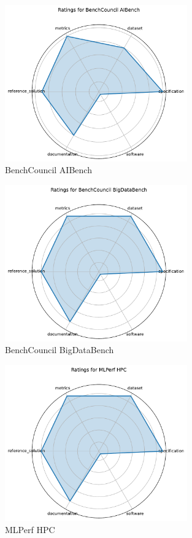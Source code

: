\documentclass{article}
\begin{document}
\begin{figure}[h!]
  \centering
  \includegraphics[width=0.7\textwidth]{BenchCouncil AIBench_radar.pdf}
  \caption{BenchCouncil AIBench}
\end{figure}

\begin{figure}[h!]
  \centering
  \includegraphics[width=0.7\textwidth]{BenchCouncil BigDataBench_radar.pdf}
  \caption{BenchCouncil BigDataBench}
\end{figure}

\begin{figure}[h!]
  \centering
  \includegraphics[width=0.7\textwidth]{MLPerf HPC_radar.pdf}
  \caption{MLPerf HPC}
\end{figure}
\end{document}
